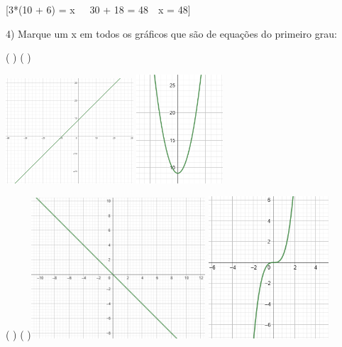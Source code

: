 [3*(10 + 6) = x\ \  \Rightarrow \ 30 + 18 = 48\  \Rightarrow \ x = 48]

4) Marque um x em todos os gráficos que são de equações do primeiro
grau:

( ) ( )

\includegraphics[width=1.87115in,height=1.54288in]{./imgSAEB_7_MAT/media/image19.png}
\includegraphics[width=1.26519in,height=1.59472in]{./imgSAEB_7_MAT/media/image20.png}

( ) (
)\includegraphics[width=2.55435in,height=2.06522in]{./imgSAEB_7_MAT/media/image21.png}
\includegraphics[width=1.76161in,height=2.0819in]{./imgSAEB_7_MAT/media/image22.png}


